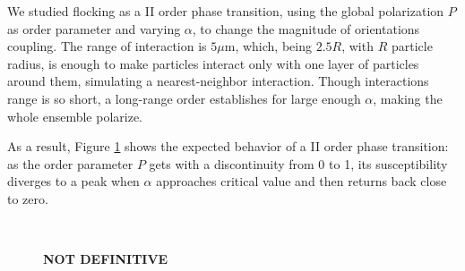\documentclass[../../master_thesis_np.tex]{subfiles}
\begin{document}
		We studied flocking as a II order phase transition, using the global polarization $P$ as order parameter and varying $\alpha$, to change the magnitude of orientations coupling. The range of interaction is $5 \mu \text{m}$, which, being $2.5R$, with $R$ particle radius, is enough to make particles interact only with one layer of particles around them, simulating a nearest-neighbor interaction. Though interactions range is so short, a long-range order establishes for large enough $\alpha$, making the whole ensemble polarize.
		
		As a result, Figure \ref{fig:phasetrans} shows the expected behavior of a II order phase transition: as the order parameter $P$ gets with a discontinuity from 0 to 1, its susceptibility diverges to a peak when $\alpha$ approaches critical value and then returns back close to zero.
		
		\begin{figure}[htp]
			\centering
			\\
			\caption{\textbf{NOT DEFINITIVE}}
			\label{fig:phasetrans}
		\end{figure}
		
\end{document}
